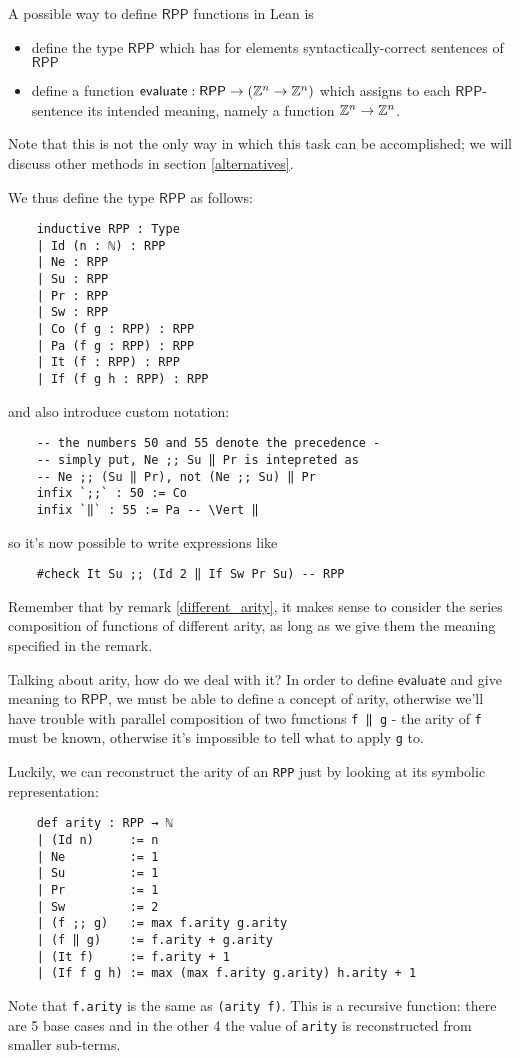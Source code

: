 \documentclass[runningheads]{llncs}
\newcommand{\RPP}{\textsf{RPP}\xspace}
\begin{document}
A possible way to define $\RPP$ functions in Lean is
\begin{itemize}
    \item define the type $\RPP$ which has for elements syntactically-correct sentences of $\RPP$
    \item define a function $\mathsf{evaluate} : \RPP \to (\ZZ^n \to \ZZ^n)$ which assigns to each $\RPP$-sentence its intended meaning,
    namely a function $\mathbb{Z}^n \to \mathbb{Z}^n$.
\end{itemize}
Note that this is not the only way in which this task can be accomplished;
we will discuss other methods in section \ref{alternatives}.

We thus define the type $\RPP$ as follows:
\begin{lstlisting}
    inductive RPP : Type
    | Id (n : ℕ) : RPP
    | Ne : RPP
    | Su : RPP
    | Pr : RPP
    | Sw : RPP
    | Co (f g : RPP) : RPP
    | Pa (f g : RPP) : RPP
    | It (f : RPP) : RPP
    | If (f g h : RPP) : RPP
\end{lstlisting}
and also introduce custom notation:
\begin{lstlisting}
    -- the numbers 50 and 55 denote the precedence -
    -- simply put, Ne ;; Su ‖ Pr is intepreted as
    -- Ne ;; (Su ‖ Pr), not (Ne ;; Su) ‖ Pr
    infix `;;` : 50 := Co
    infix `‖` : 55 := Pa -- \Vert ‖
\end{lstlisting}
so it's now possible to write expressions like
\begin{lstlisting}
    #check It Su ;; (Id 2 ‖ If Sw Pr Su) -- RPP
\end{lstlisting}
Remember that by remark \ref{different_arity}, it makes sense to consider the series composition of functions of different arity,
as long as we give them the meaning specified in the remark.

Talking about arity, how do we deal with it?
In order to define $\mathsf{evaluate}$ and give meaning to $\RPP$,
we must be able to define a concept of arity,
otherwise we'll have trouble with parallel composition of two functions \lstinline{f ‖ g} -
the arity of \lstinline{f} must be known,
otherwise it's impossible to tell what to apply \lstinline{g} to.

Luckily, we can reconstruct the arity of an \lstinline{RPP} just by looking at its symbolic representation:
\begin{lstlisting}
    def arity : RPP → ℕ
    | (Id n)     := n
    | Ne         := 1
    | Su         := 1
    | Pr         := 1
    | Sw         := 2
    | (f ;; g)   := max f.arity g.arity
    | (f ‖ g)    := f.arity + g.arity
    | (It f)     := f.arity + 1
    | (If f g h) := max (max f.arity g.arity) h.arity + 1
\end{lstlisting}
Note that \lstinline{f.arity} is the same as \lstinline{(arity f)}.
This is a recursive function:
there are 5 base cases and in the other 4 the value of \lstinline{arity} is reconstructed from smaller sub-terms.
\end{document}
